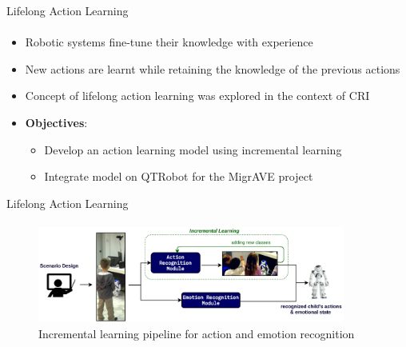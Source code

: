 \documentclass[aspectratio=169, xcolor=dvipsnames]{beamer}
\begin{document}
\begin{frame}{Lifelong Action Learning}
      \framesubtitle{}%
      
      \begin{itemize}
              \item Robotic systems fine-tune their knowledge with experience
              \item New actions are learnt while retaining the knowledge of the previous actions
              \item Concept of lifelong action learning was explored in the context of CRI
              \item \textbf{Objectives}:
              \begin{itemize}
                  \item \small Develop an action learning model using incremental learning
                  \item \small Integrate model on QTRobot for the MigrAVE project
              \end{itemize}
      \end{itemize}
\end{frame}

\begin{frame}{Lifelong Action Learning}
      \framesubtitle{}%
      \begin{figure}[h!]
      \centering
      \includegraphics[width=0.9\textwidth]{images/IL_pipeline.png} 
      \caption{Incremental learning pipeline for action and emotion recognition\footnotemark}
      \end{figure} 
\end{frame}
\end{document}
